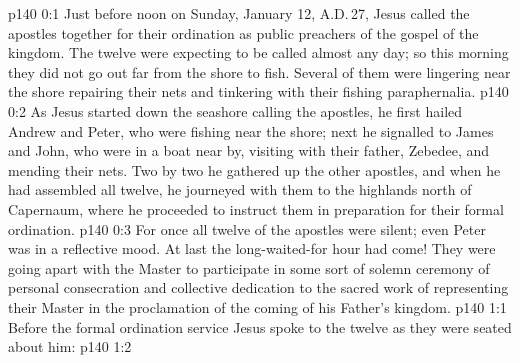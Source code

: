 \author{Midwayer Commission}
\vs p140 0:1 Just before noon on Sunday, January 12, A.D.\,27, Jesus called the apostles together for their ordination as public preachers of the gospel of the kingdom. The twelve were expecting to be called almost any day; so this morning they did not go out far from the shore to fish. Several of them were lingering near the shore repairing their nets and tinkering with their fishing paraphernalia.
\vs p140 0:2 As Jesus started down the seashore calling the apostles, he first hailed Andrew and Peter, who were fishing near the shore; next he signalled to James and John, who were in a boat near by, visiting with their father, Zebedee, and mending their nets. Two by two he gathered up the other apostles, and when he had assembled all twelve, he journeyed with them to the highlands north of Capernaum, where he proceeded to instruct them in preparation for their formal ordination.
\vs p140 0:3 For once all twelve of the apostles were silent; even Peter was in a reflective mood. At last the long\hyp{}waited\hyp{}for hour had come! They were going apart with the Master to participate in some sort of solemn ceremony of personal consecration and collective dedication to the sacred work of representing their Master in the proclamation of the coming of his Father’s kingdom.
\vs p140 1:1 Before the formal ordination service Jesus spoke to the twelve as they were seated about him: 
\vs p140 1:2 
